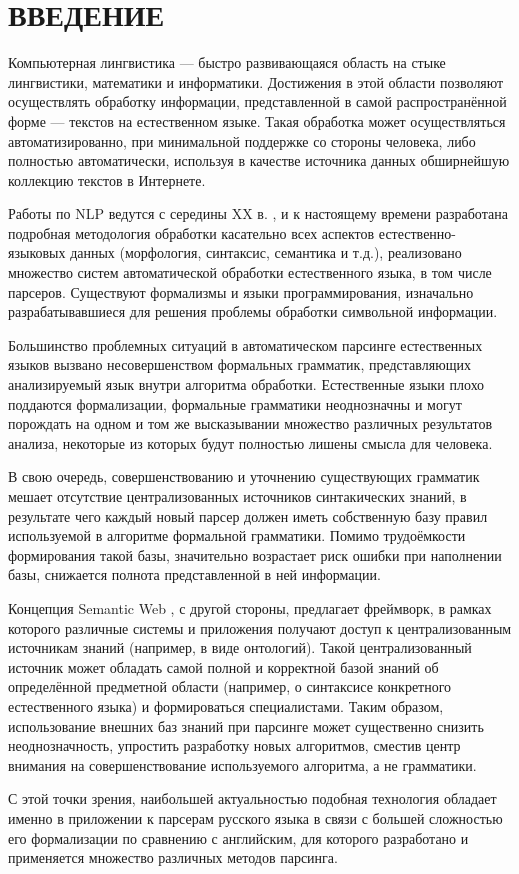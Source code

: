 \section*{\centering ВВЕДЕНИЕ}
Компьютерная лингвистика --- быстро развивающаяся область на стыке лингвистики, математики
и информатики. Достижения в этой области позволяют осуществлять обработку информации, представленной
в самой распространённой форме --- текстов на естественном языке. Такая обработка может осуществляться
автоматизированно, при минимальной поддержке со стороны человека, либо полностью автоматически, используя в качестве
источника данных обширнейшую коллекцию текстов в Интернете.

Работы по NLP ведутся с середины XX в. \cite{wiki_nlp}, и к настоящему времени разработана подробная методология
обработки касательно всех аспектов естественно-языковых данных (морфология, синтаксис, семантика и т.д.), реализовано
множество систем автоматической обработки естественного языка, в том числе парсеров. Существуют формализмы и языки программирования, 
изначально разрабатывавшиеся для решения проблемы обработки символьной информации.

Большинство проблемных ситуаций в автоматическом парсинге естественных языков вызвано несовершенством формальных грамматик, представляющих анализируемый язык внутри алгоритма обработки. Естественные языки плохо поддаются формализации, формальные грамматики неоднозначны и могут порождать на одном и том же высказывании множество различных результатов анализа, некоторые из которых будут полностью лишены смысла для человека.

В свою очередь, совершенствованию и уточнению существующих грамматик мешает отсутствие централизованных источников синтакических знаний, в результате чего каждый новый парсер должен иметь собственную базу правил используемой в алгоритме формальной грамматики. Помимо трудоёмкости формирования такой базы, значительно возрастает риск ошибки при наполнении базы, снижается полнота представленной в ней информации.

Концепция Semantic Web \cite{wiki_semantic_web}, с другой стороны, предлагает фреймворк, в рамках которого различные системы и приложения получают доступ к централизованным источникам знаний (например, в виде онтологий). Такой централизованный источник может обладать самой полной и корректной базой знаний об определённой предметной области (например, о синтаксисе конкретного естественного языка) и формироваться специалистами. Таким образом, использование внешних баз знаний при парсинге может существенно снизить неоднозначность, упростить разработку новых алгоритмов, сместив центр внимания на совершенствование используемого алгоритма, а не грамматики.

С этой точки зрения, наибольшей актуальностью подобная технология обладает именно в приложении к парсерам русского языка в связи с большей сложностью его формализации по сравнению с английским, для которого разработано и применяется множество различных методов парсинга.